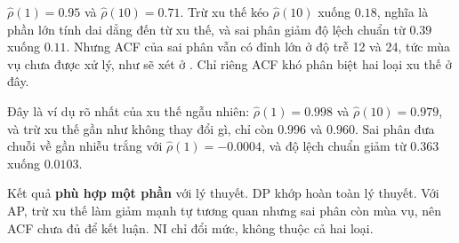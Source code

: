  $\hat\rho(1)=0.95$ và $\hat\rho(10)=0.71$. Trừ xu thế kéo $\hat\rho(10)$ xuống $0.18$, nghĩa là phần lớn tính dai dẳng đến từ xu thế, và sai phân giảm độ lệch chuẩn từ $0.39$ xuống $0.11$. Nhưng ACF của sai phân vẫn có đỉnh lớn ở độ trễ 12 và 24, tức mùa vụ chưa được xử lý, như sẽ xét ở . Chỉ riêng ACF khó phân biệt hai loại xu thế ở đây.

 Đây là ví dụ rõ nhất của xu thế ngẫu nhiên: $\hat\rho(1)=0.998$ và $\hat\rho(10)=0.979$, và trừ xu thế gần như không thay đổi gì, chỉ còn $0.996$ và $0.960$. Sai phân đưa chuỗi về gần nhiễu trắng với $\hat\rho(1)=-0.0004$, và độ lệch chuẩn giảm từ $0.363$ xuống $0.0103$.

 Kết quả \textbf{phù hợp một phần} với lý thuyết. DP khớp hoàn toàn lý thuyết. Với AP, trừ xu thế làm giảm mạnh tự tương quan nhưng sai phân còn mùa vụ, nên ACF chưa đủ để kết luận. NI chỉ đổi mức, không thuộc cả hai loại.

